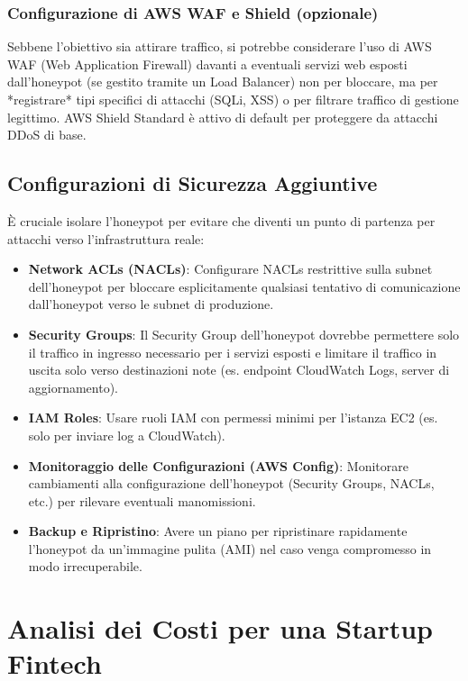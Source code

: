 \documentclass[a4paper,12pt]{report}
\begin{document}
\subsubsection{Configurazione di AWS WAF e Shield (opzionale)}
\label{subsubsec:config_waf}

Sebbene l'obiettivo sia attirare traffico, si potrebbe considerare l'uso di AWS WAF (Web Application Firewall) davanti a eventuali servizi web esposti dall'honeypot (se gestito tramite un Load Balancer) non per bloccare, ma per *registrare* tipi specifici di attacchi (SQLi, XSS) o per filtrare traffico di gestione legittimo. AWS Shield Standard è attivo di default per proteggere da attacchi DDoS di base.

\subsection{Configurazioni di Sicurezza Aggiuntive}
\label{subsec:sicurezza_aggiuntiva}

È cruciale isolare l'honeypot per evitare che diventi un punto di partenza per attacchi verso l'infrastruttura reale:

\begin{itemize}
    \item \textbf{Network ACLs (NACLs)}: Configurare NACLs restrittive sulla subnet dell'honeypot per bloccare esplicitamente qualsiasi tentativo di comunicazione dall'honeypot verso le subnet di produzione.
    \item \textbf{Security Groups}: Il Security Group dell'honeypot dovrebbe permettere solo il traffico in ingresso necessario per i servizi esposti e limitare il traffico in uscita solo verso destinazioni note (es. endpoint CloudWatch Logs, server di aggiornamento).
    \item \textbf{IAM Roles}: Usare ruoli IAM con permessi minimi per l'istanza EC2 (es. solo per inviare log a CloudWatch).
    \item \textbf{Monitoraggio delle Configurazioni (AWS Config)}: Monitorare cambiamenti alla configurazione dell'honeypot (Security Groups, NACLs, etc.) per rilevare eventuali manomissioni.
    \item \textbf{Backup e Ripristino}: Avere un piano per ripristinare rapidamente l'honeypot da un'immagine pulita (AMI) nel caso venga compromesso in modo irrecuperabile.
\end{itemize}

\section{Analisi dei Costi per una Startup Fintech}
\label{sec:analisi_costi}
\end{document}
